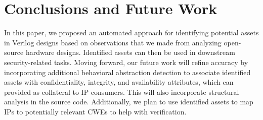 \section{Conclusions and Future Work\label{sec:conclusion}}
In this paper, we proposed an automated approach for identifying potential assets in Verilog designs based on observations that we made from analyzing open-source hardware designs. 
Identified assets can then be used in downstream security-related tasks. 
Moving forward, our future work will refine accuracy by incorporating additional behavioral abstraction detection to associate identified assets with confidentiality, integrity, and availability attributes, which can provided as collateral to IP consumers. 
This will also incorporate structural analysis in the source code. 
Additionally, we plan to use identified assets to map IPs to potentially relevant \acp{CWE} to help with verification. 

